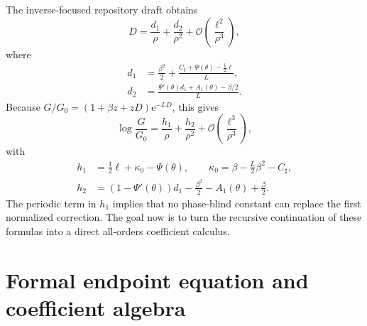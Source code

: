 \documentclass[11pt,oneside]{article}
\numberwithin{equation}{section}
\theoremstyle{definition}
\theoremstyle{remark}
\newcommand{\e}{\mathrm e}
\newcommand{\cO}{\mathcal O}
\newcommand{\Gzero}{G_0}
\newcommand{\Csharp}{C_{\sharp}}
\begin{document}
The inverse-focused repository draft obtains
\begin{equation}
 D=\frac{d_1}{\rho}+\frac{d_2}{\rho^2}
 +\cO\!\left(\frac{\ell^2}{\rho^3}\right),
 \label{eq:existing-two-phase}
\end{equation}
where
\begin{align}
 d_1&=\frac{\beta^2}{2}
 +\frac{\Csharp+\Psi(\theta)-\tfrac12\ell}{L},
 \label{eq:d1-known}\\
 d_2&=\frac{\Psi'(\theta)d_1+A_1(\theta)-\beta/2}{L}.
 \label{eq:d2-known}
\end{align}
Because $G/G_0=(1+\beta z+zD)\e^{-LD}$, this gives
\begin{equation}
 \log\frac{G}{\Gzero}=\frac{h_1}{\rho}+\frac{h_2}{\rho^2}
 +\cO\!\left(\frac{\ell^3}{\rho^3}\right),
 \label{eq:existing-two-log}
\end{equation}
with
\begin{align}
 h_1&=\frac12\ell+\kappa_0-\Psi(\theta),
 \qquad
 \kappa_0=\beta-\frac L2\beta^2-\Csharp,
 \label{eq:h1-known}\\
 h_2&=(1-\Psi'(\theta))d_1-\frac{\beta^2}{2}
 -A_1(\theta)+\frac\beta2.
 \label{eq:h2-known}
\end{align}
The periodic term in $h_1$ implies that no phase-blind constant can replace the first normalized correction.  The goal now is to turn the recursive continuation of these formulas into a direct all-orders coefficient calculus.

\section{Formal endpoint equation and coefficient algebra}
\label{sec:formal-equation}
\end{document}
